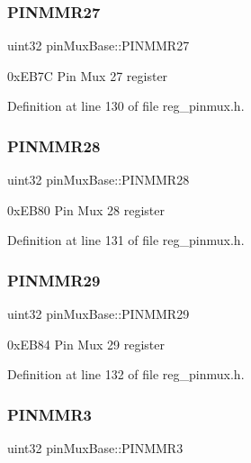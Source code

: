 \subsubsection{\texorpdfstring{P\+I\+N\+M\+M\+R27}{PINMMR27}}
{\footnotesize\ttfamily uint32 pin\+Mux\+Base\+::\+P\+I\+N\+M\+M\+R27}

0x\+E\+B7C Pin Mux 27 register 

Definition at line 130 of file reg\+\_\+pinmux.\+h.

\mbox{\label{structpinMuxBase_a04b23c7e0e005b216c3b28395eeb822c}} 
\subsubsection{\texorpdfstring{P\+I\+N\+M\+M\+R28}{PINMMR28}}
{\footnotesize\ttfamily uint32 pin\+Mux\+Base\+::\+P\+I\+N\+M\+M\+R28}

0x\+E\+B80 Pin Mux 28 register 

Definition at line 131 of file reg\+\_\+pinmux.\+h.

\mbox{\label{structpinMuxBase_a9ad2a992d2aa4658ef6d643dd1e29ce0}} 
\subsubsection{\texorpdfstring{P\+I\+N\+M\+M\+R29}{PINMMR29}}
{\footnotesize\ttfamily uint32 pin\+Mux\+Base\+::\+P\+I\+N\+M\+M\+R29}

0x\+E\+B84 Pin Mux 29 register 

Definition at line 132 of file reg\+\_\+pinmux.\+h.

\mbox{\label{structpinMuxBase_ac8e1e167da6fe7be6f80eccb854c1931}} 
\subsubsection{\texorpdfstring{P\+I\+N\+M\+M\+R3}{PINMMR3}}
{\footnotesize\ttfamily uint32 pin\+Mux\+Base\+::\+P\+I\+N\+M\+M\+R3}

